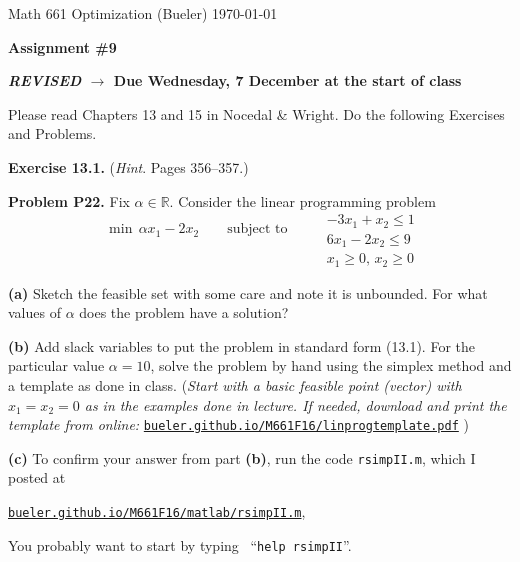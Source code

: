 \documentclass[12pt,reqno]{amsart}
\newcommand{\RR}{\mathbb{R}}
\newcommand{\prob}[1]{\bigskip\noindent\textbf{#1.}\quad }
\newcommand{\exer}[1]{\prob{Exercise #1}}
\newcommand{\epart}[1]{\medskip\noindent\textbf{(#1)}\quad }
\begin{document}
\scriptsize \noindent Math 661 Optimization (Bueler) \hfill \today
\normalsize

\medskip

\Large\centerline{\textbf{Assignment \#9}}
\large
\medskip

\centerline{\textbf{\emph{REVISED} $\to$ \quad Due Wednesday, 7 December at the start of class}}

\normalsize

\thispagestyle{empty}

\bigskip

\noindent Please read Chapters 13 and 15 in Nocedal \& Wright.  Do the following Exercises and Problems.


\exer{13.1}  (\emph{Hint}.  Pages 356--357.)


\prob{Problem P22}  Fix $\alpha \in \RR$.  Consider the linear programming problem
    $$\begin{matrix}
    \min \, \alpha x_1 - 2 x_2 \qquad \text{subject to} \\
    \phantom{\bigg|}
    \end{matrix}   \qquad
      \begin{matrix} -3 x_1 +   x_2 \le 1 \\
                      6 x_1 - 2 x_2 \le 9 \\
                      x_1 \ge 0,\, x_2 \ge 0 \end{matrix}$$

\epart{a}  Sketch the feasible set with some care and note it is unbounded.  For what values of $\alpha$ does the problem have a solution?

\epart{b}  Add slack variables to put the problem in standard form (13.1).  For the particular value $\alpha = 10$, solve the problem by hand using the simplex method and a template as done in class.  (\emph{Start with a basic feasible point (vector) with $x_1=x_2=0$ as in the examples done in lecture.  If needed, download and print the template from online:} \small \href{http://bueler.github.io/M661F16/linprogtemplate.pdf}{\texttt{bueler.github.io/M661F16/linprogtemplate.pdf}} \normalsize)

\epart{c}  To confirm your answer from part \textbf{(b)}, run the code \texttt{rsimpII.m}, which I posted at \small

  \centerline{\href{http://bueler.github.io/M661F16/matlab/rsimpII.m}{\texttt{bueler.github.io/M661F16/matlab/rsimpII.m}},} \normalsize
  
\noindent You probably want to start by typing \, ``\texttt{help rsimpII}''.
\end{document}
